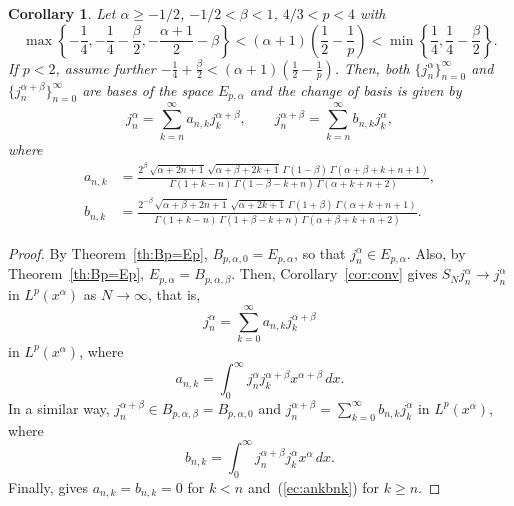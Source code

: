 \documentclass[reqno]{amsart}
\theoremstyle{plain}
\newtheorem{Cor}[Thm]{Corollary} %
\theoremstyle{definition}
\theoremstyle{remark}
\begin{document}
\begin{Cor}
Let $\alpha\ge-1/2$, $-1/2 < \beta < 1$, $4/3 < p < 4$ with
\begin{equation*}
   \max\left\{ -\frac14, -\frac14 - \frac\beta2, - \frac{\alpha+1}2 - \beta
       \right\}
   < (\alpha+1) \left(\frac12 - \frac1p \right) <
   \min\left\{ \frac14, \frac14 - \frac\beta2 \right\}.
\end{equation*}
If $p<2$, assume further $-\frac14 + \frac\beta2 < (\alpha+1) \left(\frac12 -
\frac1p \right)$.
Then, both $\{j_n^\alpha\}_{n=0}^\infty$ and
$\{j_n^{\alpha+\beta}\}_{n=0}^\infty$ are bases of the space $E_{p,\alpha}$
and the change of basis is given by
\begin{equation*}
    j_n^\alpha = \sum_{k=n}^\infty a_{n,k} j_k^{\alpha+\beta},
    \qquad
    j_n^{\alpha+\beta} = \sum_{k=n}^\infty b_{n,k} j_k^\alpha,
\end{equation*}
where
\begin{equation}
\label{ec:ankbnk}
\begin{split}
    a_{n,k} &= \frac{2^\beta \, \sqrt{\alpha + 2n + 1} \,
        \sqrt{\alpha+\beta+2k+1} \,
        \Gamma(1-\beta) \, \Gamma(\alpha+\beta+k+n+1)}
       {\Gamma(1+k-n) \, \Gamma(1-\beta-k+n)\,
        \Gamma(\alpha+k+n+2)},
    \\
    b_{n,k} &= \frac{ 2^{-\beta} \, \sqrt{\alpha+\beta+2n+1} \,
        \sqrt{\alpha+2k+1} \,
        \Gamma(1+\beta) \, \Gamma(\alpha+k+n+1) }
      { \Gamma(1+k-n) \, \Gamma(1+\beta-k+n)\,
        \Gamma(\alpha+\beta+k+n+2) }.
\end{split}
\end{equation}
\end{Cor}

\begin{proof}
By Theorem~\ref{th:Bp=Ep}, $B_{p,\alpha,0} = E_{p,\alpha}$, so that
$j_n^\alpha \in E_{p,\alpha}$. Also, by Theorem~\ref{th:Bp=Ep}, $E_{p,\alpha}
= B_{p,\alpha,\beta}$. Then, Corollary~\ref{cor:conv} gives $S_N j_n^\alpha
\to j_n^\alpha$ in $L^p(x^\alpha)$ as $N\to\infty$, that is,
\begin{equation*}
   j_n^\alpha = \sum_{k=0}^\infty a_{n,k} j_k^{\alpha+\beta}
\end{equation*}
in $L^p(x^\alpha)$, where
\begin{equation*}
   a_{n,k} =
   \int_0^\infty j_n^\alpha j_k^{\alpha+\beta} x^{\alpha+\beta} \, dx.
\end{equation*}
In a similar way, $j_n^{\alpha+\beta} \in B_{p,\alpha,\beta} = B_{p,\alpha,0}$
and $j_n^{\alpha+\beta} = \sum_{k=0}^\infty b_{n,k} j_k^\alpha$ in
$L^p(x^\alpha)$, where
\begin{equation*}
   b_{n,k} =
   \int_0^\infty j_n^{\alpha+\beta} j_k^\alpha x^\alpha \, dx.
\end{equation*}
Finally, \cite[Ch.~XIII, 13.41 (2), p.~403]{Wat} gives $a_{n,k} = b_{n,k} = 0$
for $k<n$ and~(\ref{ec:ankbnk}) for $k \geq n$.
\end{proof}
\end{document}
